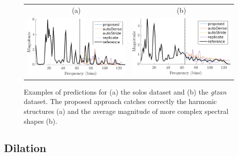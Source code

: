 \documentclass{article}
\begin{document}
\begin{figure}[t]
\center
\begin{tabular}{cc}
  (a) & (b) \\
  \includegraphics[width = .95\columnwidth]{figures/solos_1141.png}
&
  \includegraphics[width = .95\columnwidth]{figures/gtzan_1120.png}
\end{tabular}
\caption{Examples of predictions for (a) the solos dataset and (b) the \textit{gtzan} dataset. The proposed approach catches correctly the harmonic structures (a) and the average magnitude of more complex spectral shapes (b).}
\label{fig:spec}
\end{figure}

\subsection*{Dilation}
\end{document}
